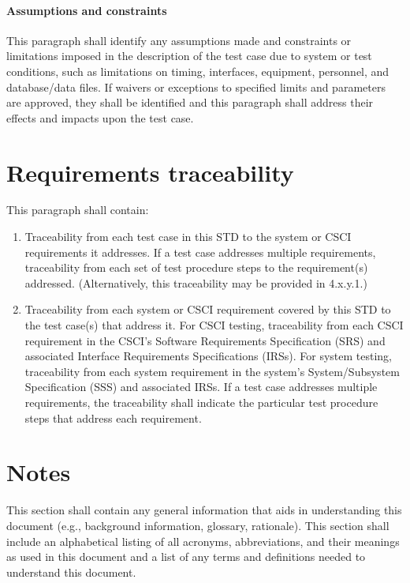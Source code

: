 \documentclass{fidata-report-template}
\begin{document}
\paragraph{Assumptions and constraints}

This paragraph shall identify any assumptions made and constraints or
limitations imposed in the description of the test case due to system or
test conditions, such as limitations on timing, interfaces, equipment,
personnel, and database/data files. If waivers or exceptions to
specified limits and parameters are approved, they shall be identified
and this paragraph shall address their effects and impacts upon the test
case.

\section{Requirements traceability}

This paragraph shall contain:

\begin{enumerate}
\itemsep1pt\parskip0pt
\item
  Traceability from each test case in this STD to the system or CSCI
  requirements it addresses. If a test case addresses multiple
  requirements, traceability from each set of test procedure steps to
  the requirement(s) addressed. (Alternatively, this traceability may be
  provided in 4.x.y.1.)
\item
  Traceability from each system or CSCI requirement covered by this STD
  to the test case(s) that address it. For CSCI testing, traceability
  from each CSCI requirement in the CSCI's Software Requirements
  Specification (SRS) and associated Interface Requirements
  Specifications (IRSs). For system testing, traceability from each
  system requirement in the system's System/Subsystem Specification
  (SSS) and associated IRSs. If a test case addresses multiple
  requirements, the traceability shall indicate the particular test
  procedure steps that address each requirement.
\end{enumerate}

\section{Notes}

This section shall contain any general information that aids in
understanding this document (e.g., background information, glossary,
rationale). This section shall include an alphabetical listing of all
acronyms, abbreviations, and their meanings as used in this document and
a list of any terms and definitions needed to understand this document.
\end{document}
